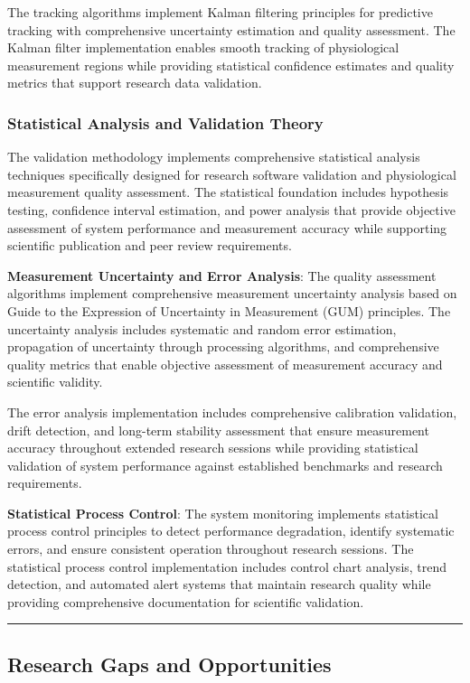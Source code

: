 \documentclass[11pt,a4paper]{article}
\begin{document}
The tracking algorithms implement Kalman filtering principles for predictive tracking with comprehensive uncertainty
estimation and quality assessment. The Kalman filter implementation enables smooth tracking of physiological measurement
regions while providing statistical confidence estimates and quality metrics that support research data validation.

\subsubsection{Statistical Analysis and Validation Theory}

The validation methodology implements comprehensive statistical analysis techniques specifically designed for research
software validation and physiological measurement quality assessment. The statistical foundation includes hypothesis
testing, confidence interval estimation, and power analysis that provide objective assessment of system performance and
measurement accuracy while supporting scientific publication and peer review requirements.

\textbf{Measurement Uncertainty and Error Analysis}: The quality assessment algorithms implement comprehensive measurement
uncertainty analysis based on Guide to the Expression of Uncertainty in Measurement (GUM) principles. The uncertainty
analysis includes systematic and random error estimation, propagation of uncertainty through processing algorithms, and
comprehensive quality metrics that enable objective assessment of measurement accuracy and scientific validity.

The error analysis implementation includes comprehensive calibration validation, drift detection, and long-term
stability assessment that ensure measurement accuracy throughout extended research sessions while providing statistical
validation of system performance against established benchmarks and research requirements.

\textbf{Statistical Process Control}: The system monitoring implements statistical process control principles to detect
performance degradation, identify systematic errors, and ensure consistent operation throughout research sessions. The
statistical process control implementation includes control chart analysis, trend detection, and automated alert systems
that maintain research quality while providing comprehensive documentation for scientific validation.

\hrule

\subsection{Research Gaps and Opportunities}
\end{document}
